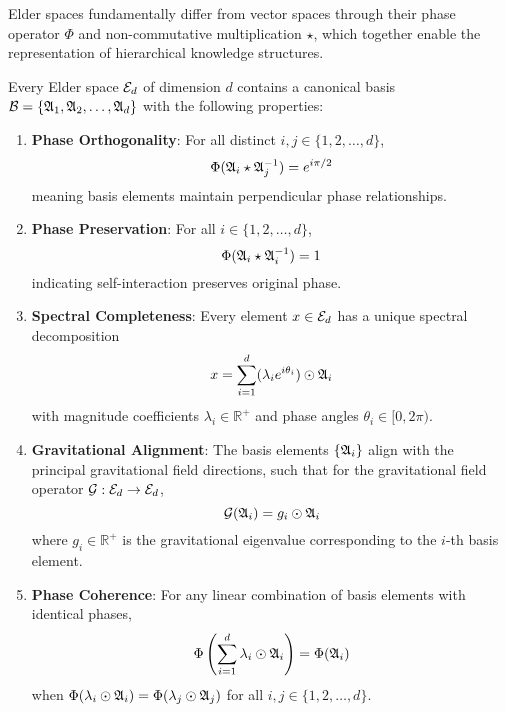 Elder spaces fundamentally differ from vector spaces through their phase operator $\Phi$ and non-commutative multiplication $\star$, which together enable the representation of hierarchical knowledge structures.

\begin{theorem}
Every Elder space $\mathcal{E}_{d}$ of dimension $d$ contains a canonical basis $\mathcal{B} = \{\mathfrak{A}_{1}, \mathfrak{A}_{2}, \ldots, \mathfrak{A}_{d}\}$ with the following properties:
\begin{enumerate}
    \item \textbf{Phase Orthogonality}: For all distinct $i, j \in \{1, 2, \ldots, d\}$,
    \begin{equation}
        \Phi(\mathfrak{A}_{i} \star \mathfrak{A}_{j}^{-1}) = e^{i\pi/2}
    \end{equation}
    meaning basis elements maintain perpendicular phase relationships.
    
    \item \textbf{Phase Preservation}: For all $i \in \{1, 2, \ldots, d\}$,
    \begin{equation}
        \Phi(\mathfrak{A}_{i} \star \mathfrak{A}_{i}^{-1}) = 1
    \end{equation}
    indicating self-interaction preserves original phase.
    
    \item \textbf{Spectral Completeness}: Every element $x \in \mathcal{E}_{d}$ has a unique spectral decomposition
    \begin{equation}
        x = \sum_{i=1}^{d} (\lambda_i e^{i\theta_i}) \odot \mathfrak{A}_{i}
    \end{equation}
    with magnitude coefficients $\lambda_i \in \mathbb{R}^+$ and phase angles $\theta_i \in [0, 2\pi)$.
    
    \item \textbf{Gravitational Alignment}: The basis elements $\{\mathfrak{A}_{i}\}$ align with the principal gravitational field directions, such that for the gravitational field operator $\mathcal{G}: \mathcal{E}_{d} \rightarrow \mathcal{E}_{d}$,
    \begin{equation}
        \mathcal{G}(\mathfrak{A}_{i}) = g_i \odot \mathfrak{A}_{i}
    \end{equation}
    where $g_i \in \mathbb{R}^+$ is the gravitational eigenvalue corresponding to the $i$-th basis element.
    
    \item \textbf{Phase Coherence}: For any linear combination of basis elements with identical phases,
    \begin{equation}
        \Phi\left(\sum_{i=1}^{d} \lambda_i \odot \mathfrak{A}_{i}\right) = \Phi(\mathfrak{A}_{i})
    \end{equation}
    when $\Phi(\lambda_i \odot \mathfrak{A}_{i}) = \Phi(\lambda_j \odot \mathfrak{A}_{j})$ for all $i,j \in \{1,2,\ldots,d\}$.
\end{enumerate}
\end{theorem}

